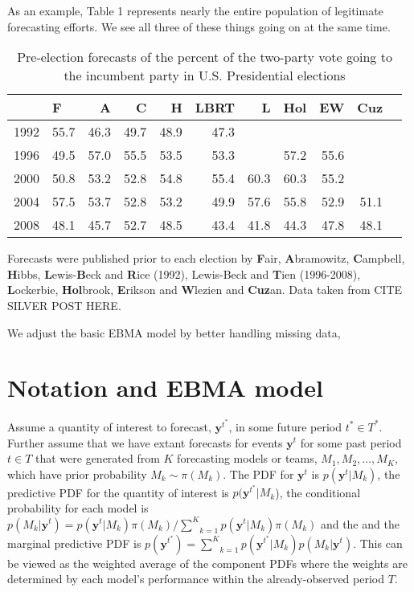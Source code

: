 \documentclass[12pt,fullpage,endnotes]{article}
\begin{document}
As an example, Table 1 represents nearly the entire population of
legitimate forecasting efforts.  We see all three of these things
going on at the same time.


\begin{table}[ht]
\caption{Pre-election forecasts of the percent of the two-party vote going to the incumbent party in U.S. Presidential elections}
\footnotesize
\begin{center}
\begin{tabular}{rlrrrrrrrrr}
  \toprule
  & F & A & C & H & LBRT & L & Hol & EW & Cuz \\ 
  \midrule
  1992 & 55.7 & 46.3 & 49.7 & 48.9 & 47.3 &  &  &  &  \\ 
  1996 & 49.5 & 57.0 & 55.5 & 53.5 & 53.3 &  & 57.2 & 55.6 &  \\ 
  2000 & 50.8 & 53.2 & 52.8 & 54.8 & 55.4 & 60.3 & 60.3 & 55.2 &  \\ 
  2004 & 57.5 & 53.7 & 52.8 & 53.2 & 49.9 & 57.6 & 55.8 & 52.9 & 51.1 \\ 
  2008 & 48.1 & 45.7 & 52.7 & 48.5 & 43.4 & 41.8 & 44.3 & 47.8 & 48.1 \\ 
  \bottomrule

\end{tabular}
\end{center}
Forecasts were published prior to each election by \textbf{F}air, \textbf{A}bramowitz, \textbf{C}ampbell, \textbf{H}ibbs, \textbf{L}ewis-\textbf{B}eck and \textbf{R}ice (1992), Lewis-Beck and \textbf{T}ien  (1996-2008),   \textbf{L}ockerbie, \textbf{Hol}brook, \textbf{E}rikson and \textbf{W}lezien and \textbf{Cuz}an.  Data taken from CITE SILVER POST HERE.
\end{table}


We adjust the basic EBMA model by better handling missing data, 

\section{Notation and EBMA model} 

Assume a quantity of interest to forecast, $\mathbf{y}^{t^*}$, in some
future period $t^\ast \in T^\ast$.  Further assume that we have extant
forecasts for events $\mathbf{y}^t$ for some past period $t \in T$
that were generated from $K$ forecasting models or teams, $M_1, M_2,
\ldots, M_K$, which have prior probability $M_k\sim \pi(M_k)$. The PDF
for $\mathbf{y}^t$ is $p(\mathbf{y}^t|M_k)$, the predictive PDF for
the quantity of interest is $p(\mathbf{y}^{t^*}|M_k$), the conditional
probability for each model is $p(M_k|\mathbf{y}^t) =
p(\mathbf{y}^t|M_k)\pi(M_k)/\underset{k=1}{\overset{K}{\sum}}p(\mathbf{y}^t|M_k)\pi(M_k)$
and the and the marginal predictive PDF is $p(\mathbf{y}^{t^*}) =
\underset{k=1}{\overset{K}{\sum}}
p(\mathbf{y}^{t^*}|M_k)p(M_k|\mathbf{y}^{t})$.  This can be viewed as
the weighted average of the component PDFs where the weights are
determined by each model's performance within the already-observed
period $T$.
\end{document}
